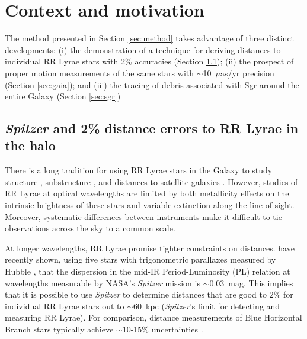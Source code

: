 \section{Context and motivation} \label{sec:context}
The method presented in Section \ref{sec:method} takes advantage of
three distinct developments: (i)
the demonstration of a technique for deriving distances to individual
RR Lyrae stars with 2\% accuracies (Section \ref{sec:spitzer}); (ii)
the prospect of proper motion measurements of the same stars with
$\sim$10~$\mu$as/yr precision (Section \ref{sec:gaia}); and (iii) the
tracing of debris associated with Sgr around the entire Galaxy
(Section \ref{sec:sgr})

\subsection{{\it Spitzer} and 2\% distance errors to RR Lyrae in the halo}
\label{sec:spitzer}

There is a long tradition for using RR Lyrae stars in the Galaxy to
study structure 
\citep[e.g.][]{shapley18}, substructure
\citep[e.g.][]{sesar10}, and distances to satellite galaxies
\citep[e.g.][]{clementini03}.  However, studies of RR Lyrae at optical
wavelengths are limited by both metallicity effects on the intrinsic
brightness of these stars and variable extinction along the line of
sight.  Moreover, systematic differences between instruments make it
difficult to tie observations across the sky to a common scale. 

At longer wavelengths, RR Lyrae promise tighter constraints on
distances.  
\citet{madore12} have recently shown, 
using five stars with
trigonometric parallaxes measured by Hubble \citep{benedict11},
that the dispersion in the mid-IR Period-Luminosity (PL) relation 
\citep[first mapped by][]{longmore86}
at
wavelengths measurable by NASA's {\it Spitzer} mission is $\sim$0.03~mag.
This implies that it is
possible to use {\it Spitzer} to determine distances that are good to $2\%$ for 
individual RR Lyrae stars out to $\sim$60~kpc ({\it Spitzer}'s limit for detecting and measuring RR Lyrae).
For comparison, distance measurements of Blue Horizontal Branch
stars typically
achieve $\sim$10-15\% uncertainties  \citep[if appropriate color measurements are available, e.g.,][]{deason12b}.

